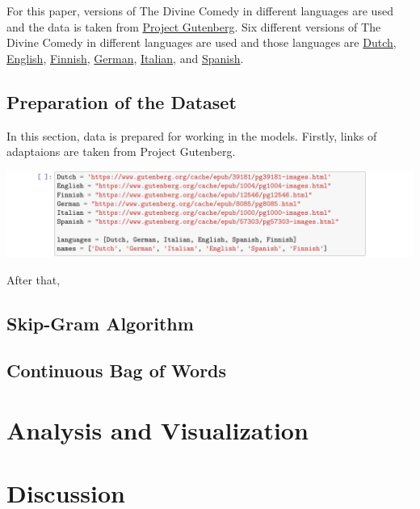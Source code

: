 \documentclass[man]{apa7}
\begin{document}
For this paper, versions of The Divine Comedy in different languages are used and the data is taken from \href{https://www.gutenberg.org/}{Project Gutenberg}. Six different versions of The Divine Comedy in different languages are used and those languages are \href{https://www.gutenberg.org/cache/epub/39181/pg39181-images.html}{Dutch}, \href{https://www.gutenberg.org/cache/epub/1004/pg1004-images.html}{English}, \href{https://www.gutenberg.org/cache/epub/12546/pg12546.html}{Finnish}, \href{https://www.gutenberg.org/cache/epub/8085/pg8085.html}{German}, \href{https://www.gutenberg.org/cache/epub/1000/pg1000-images.html}{Italian}, and \href{https://www.gutenberg.org/cache/epub/57303/pg57303-images.html}{Spanish}.

\subsection{Preparation of the Dataset}

In this section, data is prepared for working in the models. Firstly, links of adaptaions are taken from Project Gutenberg. 

\begin{center}

\includegraphics[width=\textwidth]{languages.pdf}

\end{center}

After that, 

\subsection{Skip-Gram Algorithm}

\subsection{Continuous Bag of Words}

\section{Analysis and Visualization}

\section{Discussion}
\end{document}
